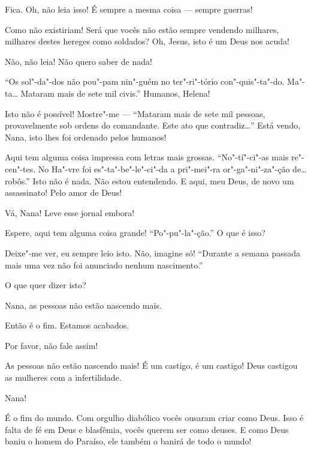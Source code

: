  Fica. Oh, não leia isso! É sempre a mesma coisa --- sempre guerras!

 Como não existiriam! Será que vocês não estão sempre vendendo milhares,
milhares destes hereges como soldados? Oh, Jesus, isto é um Deus nos acuda!

 Não, não leia! Não quero saber de nada!

  ``Os sol"-da"-dos não pou"-pam nin"-guém no ter"-ri"-tório
con"-quis"-ta"-do. Ma"-ta\ldots{} Mataram mais de sete mil civis.'' Humanos, Helena!

 Isto não é possível! Mostre"-me --- 
``Mataram mais de sete mil pessoas, provavelmente sob ordens do comandante. Este
ato que contradiz\ldots{}” Está vendo, Nana, isto lhes foi ordenado pelos humanos!

 Aqui tem alguma coisa impressa com letras mais grossas. ``No"-tí"-ci"-as mais
re"-cen"-tes. No Ha"-vre foi es"-ta"-be"-le"-ci"-da a pri"-mei"-ra or"-ga"-ni"-za"-ção de\ldots{}
robôs.'' Isto não é nada. Não estou entendendo. E aqui, meu Deus, de novo um
assassinato! Pelo amor de Deus!

 Vá, Nana! Leve esse jornal embora!

 Espere, aqui tem alguma coisa grande! ``Po"-pu"-la"-ção.'' O que é isso?

 Deixe"-me ver, eu sempre leio isto.  Não, imagine
só!  “Durante a semana passada mais uma vez não foi anunciado nenhum
nascimento.'' 

 O que quer dizer isto?

 Nana, as pessoas não estão nascendo mais.

  Então é o fim. Estamos acabados.

 Por favor, não fale assim!

 As pessoas não estão nascendo mais! É um castigo, é um castigo! Deus
castigou as mulheres com a infertilidade.

  Nana!

  É o fim do mundo. Com orgulho diabólico vocês ousaram
criar como Deus. Isso é falta de fé em Deus e blasfêmia, vocês querem ser como
deuses. E como Deus baniu o homem do Paraíso, ele também o banirá de todo o
mundo!

